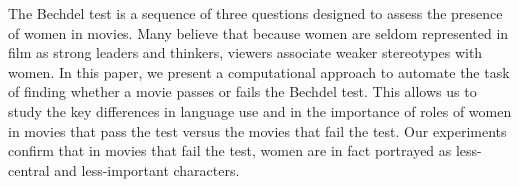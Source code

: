 The Bechdel test is a sequence of three questions designed to assess the presence of women in movies. Many believe that because women are seldom represented in film as strong leaders and thinkers, viewers associate weaker stereotypes with women. In this paper, we present a computational approach to automate the task of finding whether a movie passes or fails the Bechdel test. This allows us to study the key differences in language use and in the importance of roles of women in movies that pass the test versus the movies that fail the test. Our experiments confirm that in movies that fail the test, women are in fact portrayed as less-central and less-important characters.
